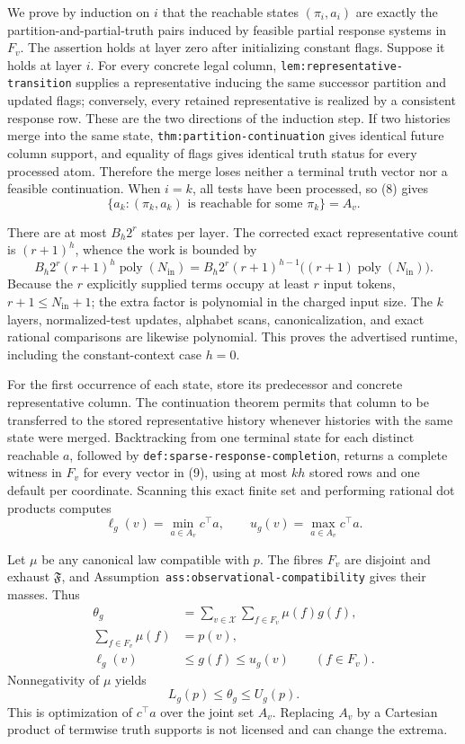 We prove by induction on \(i\) that the reachable states \((\pi_i,a_i)\) are exactly the partition-and-partial-truth pairs induced by feasible partial response systems in \(F_v\). The assertion holds at layer zero after initializing constant flags. Suppose it holds at layer \(i\). For every concrete legal column, \texttt{lem:representative-transition} supplies a representative inducing the same successor partition and updated flags; conversely, every retained representative is realized by a consistent response row. These are the two directions of the induction step. If two histories merge into the same state, \texttt{thm:partition-continuation} gives identical future column support, and equality of flags gives identical truth status for every processed atom. Therefore the merge loses neither a terminal truth vector nor a feasible continuation. When \(i=k\), all tests have been processed, so (8) gives
\[
 \{a_k:(\pi_k,a_k)\text{ is reachable for some }\pi_k\}=A_v.
 \tag{9}
\]

There are at most \(B_h2^r\) states per layer. The corrected exact representative count is \((r+1)^h\), whence the work is bounded by
\[
 B_h2^r(r+1)^h\operatorname{poly}(N_{\mathrm{in}})
 =B_h2^r(r+1)^{h-1}\bigl((r+1)\operatorname{poly}(N_{\mathrm{in}})\bigr).
\]
Because the \(r\) explicitly supplied terms occupy at least \(r\) input tokens, \(r+1\leq N_{\mathrm{in}}+1\); the extra factor is polynomial in the charged input size. The \(k\) layers, normalized-test updates, alphabet scans, canonicalization, and exact rational comparisons are likewise polynomial. This proves the advertised runtime, including the constant-context case \(h=0\).

For the first occurrence of each state, store its predecessor and concrete representative column. The continuation theorem permits that column to be transferred to the stored representative history whenever histories with the same state were merged. Backtracking from one terminal state for each distinct reachable \(a\), followed by \texttt{def:sparse-response-completion}, returns a complete witness in \(F_v\) for every vector in (9), using at most \(kh\) stored rows and one default per coordinate. Scanning this exact finite set and performing rational dot products computes
\[
 \ell_g(v)=\min_{a\in A_v}c^\top a,
 \qquad
 u_g(v)=\max_{a\in A_v}c^\top a.
 \tag{10}
\]

Let \(\mu\) be any canonical law compatible with \(p\). The fibres \(F_v\) are disjoint and exhaust \(\mathfrak F\), and Assumption~\texttt{ass:observational-compatibility} gives their masses. Thus
\[
 \begin{aligned}
 \theta_g&=\sum_{v\in\mathcal X}\sum_{f\in F_v}\mu(f)g(f),\\
 \sum_{f\in F_v}\mu(f)&=p(v),\\
 \ell_g(v)&\leq g(f)\leq u_g(v)\qquad(f\in F_v).
 \end{aligned}
\]
Nonnegativity of \(\mu\) yields
\[
 L_g(p)\leq\theta_g\leq U_g(p).
 \tag{11}
\]
This is optimization of \(c^\top a\) over the joint set \(A_v\). Replacing \(A_v\) by a Cartesian product of termwise truth supports is not licensed and can change the extrema.

